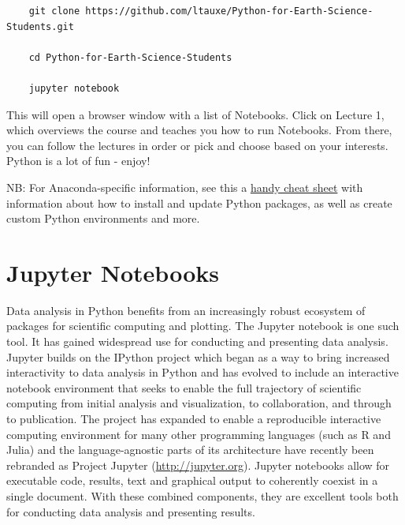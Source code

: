 \documentclass[11pt]{book}
\begin{document}
{{\begin{enumerate}
\begin{verbatim}
    git clone https://github.com/ltauxe/Python-for-Earth-Science-Students.git

    cd Python-for-Earth-Science-Students

    jupyter notebook
\end{verbatim}

\end{enumerate}
This will open a browser window with a list of Notebooks.  Click on Lecture 1, which overviews the course and teaches you how to run Notebooks.  From there, you can follow the lectures in order or pick and choose based on your interests. Python is a lot of fun - enjoy!

NB: For Anaconda-specific information, see this a \href{https://conda.io/docs/_downloads/conda-cheatsheet.pdf}{handy cheat sheet} with information about how to install and update Python packages, as well as create custom Python environments and more.

\chapter{Jupyter Notebooks}
\label{chap:notebooks}

Data analysis in Python benefits from an increasingly robust ecosystem of packages for scientific computing and plotting. The Jupyter notebook is one such tool.  It has gained widespread use for conducting and presenting data analysis. Jupyter builds on the IPython project which began as a way to bring increased interactivity to data analysis in Python \citep{perez07} and has evolved to include an interactive notebook environment that seeks to enable the full trajectory of scientific computing from initial analysis and visualization, to collaboration, and through to publication. The project has expanded to enable a reproducible interactive computing environment for many other programming languages (such as R and Julia) and the language-agnostic parts of its architecture have recently been rebranded as Project Jupyter (\url{http://jupyter.org}). Jupyter notebooks allow for executable code, results, text and graphical output to coherently coexist in a single document. With these combined components, they are excellent tools both for conducting data analysis and presenting results.



}}
\end{document}

